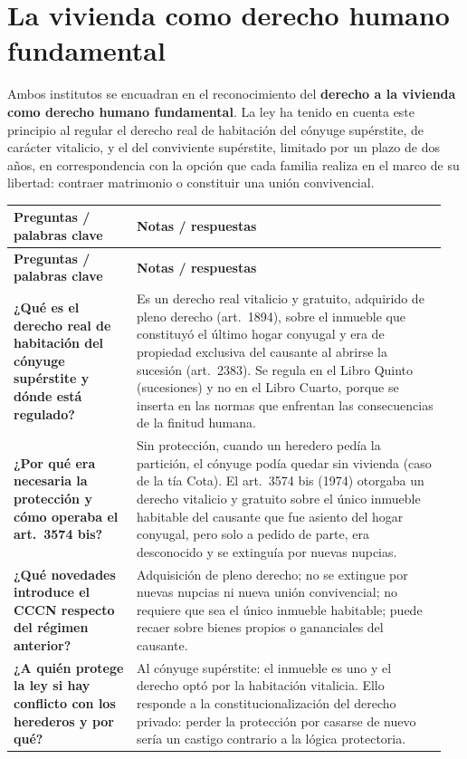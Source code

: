 \documentclass[12pt,oneside]{book}
\makeatletter
\newenvironment{cornell}{%
    \par\vspace{0.5em}
    \noindent
    \begin{longtable}{@{}>{\raggedright\arraybackslash}p{0.27\linewidth}
                         >{\raggedright\arraybackslash}p{0.68\linewidth}@{}}
    \toprule
    \textbf{Preguntas / palabras clave} & \textbf{Notas / respuestas} \\
    \midrule
    \endfirsthead
    \toprule
    \textbf{Preguntas / palabras clave} & \textbf{Notas / respuestas} \\
    \midrule
    \endhead
}{%
    \bottomrule
    \end{longtable}
}
\makeatother
\begin{document}
\section{La vivienda como derecho humano fundamental}

Ambos institutos se encuadran en el reconocimiento del \textbf{derecho a la vivienda como derecho humano fundamental}. La ley ha tenido en cuenta este principio al regular el derecho real de habitación del cónyuge supérstite, de carácter vitalicio, y el del conviviente supérstite, limitado por un plazo de dos años, en correspondencia con la opción que cada familia realiza en el marco de su libertad: contraer matrimonio o constituir una unión convivencial.

\begin{cornell}
\textbf{¿Qué es el derecho real de habitación del cónyuge supérstite y dónde está regulado?} &
Es un derecho real vitalicio y gratuito, adquirido de pleno derecho (art.~1894), sobre el inmueble que constituyó el último hogar conyugal y era de propiedad exclusiva del causante al abrirse la sucesión (art.~2383). Se regula en el Libro Quinto (sucesiones) y no en el Libro Cuarto, porque se inserta en las normas que enfrentan las consecuencias de la finitud humana. \\

\textbf{¿Por qué era necesaria la protección y cómo operaba el art.~3574 bis?} &
Sin protección, cuando un heredero pedía la partición, el cónyuge podía quedar sin vivienda (caso de la tía Cota). El art.~3574 bis (1974) otorgaba un derecho vitalicio y gratuito sobre el único inmueble habitable del causante que fue asiento del hogar conyugal, pero solo a pedido de parte, era desconocido y se extinguía por nuevas nupcias. \\

\textbf{¿Qué novedades introduce el CCCN respecto del régimen anterior?} &
Adquisición de pleno derecho; no se extingue por nuevas nupcias ni nueva unión convivencial; no requiere que sea el único inmueble habitable; puede recaer sobre bienes propios o gananciales del causante. \\

\textbf{¿A quién protege la ley si hay conflicto con los herederos y por qué?} &
Al cónyuge supérstite: el inmueble es uno y el derecho optó por la habitación vitalicia. Ello responde a la constitucionalización del derecho privado: perder la protección por casarse de nuevo sería un castigo contrario a la lógica protectoria. \\


\end{cornell}
\end{document}
